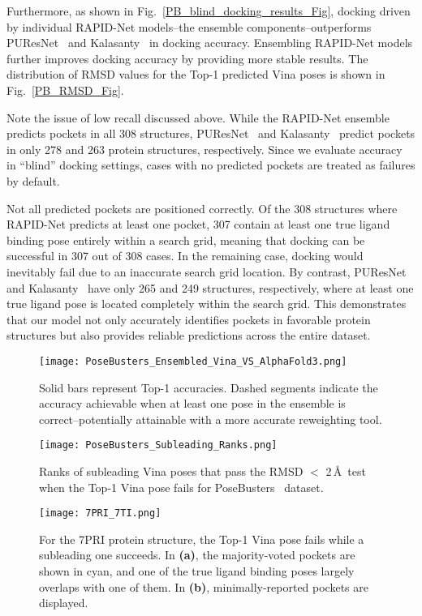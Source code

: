 \documentclass[10pt,conference]{IEEEtran}
\begin{document}
Furthermore, as shown in Fig.~\ref{PB_blind_docking_results_Fig}, docking driven by individual RAPID-Net models--the ensemble components--outperforms PUResNet~\cite{kandel2021puresnet} and Kalasanty~\cite{stepniewska2020improving} in docking accuracy. Ensembling RAPID-Net models further improves docking accuracy by providing more stable results. The distribution of RMSD values for the Top-1 predicted Vina poses is shown in Fig.~\ref{PB_RMSD_Fig}. 

Note the issue of low recall discussed above. While the RAPID-Net ensemble predicts pockets in all 308 structures, PUResNet~\cite{kandel2021puresnet} and Kalasanty~\cite{stepniewska2020improving} predict pockets in only 278 and 263 protein structures, respectively. Since we evaluate accuracy in ``blind'' docking settings, cases with no predicted pockets are treated as failures by default.

Not all predicted pockets are positioned correctly. Of the 308 structures where RAPID-Net predicts at least one pocket, 307 contain at least one true ligand binding pose entirely within a search grid, meaning that docking can be successful in 307 out of 308 cases. In the remaining case, docking would inevitably fail due to an inaccurate search grid location. By contrast, PUResNet~\cite{kandel2021puresnet} and Kalasanty~\cite{stepniewska2020improving} have only 265 and 249 structures, respectively, where at least one true ligand pose is located completely within the search grid. This demonstrates that our model not only accurately identifies pockets in favorable protein structures but also provides reliable predictions across the entire dataset.

\begin{figure}[]{}
\texttt{[image: PoseBusters\_Ensembled\_Vina\_VS\_AlphaFold3.png]}
\caption{Solid bars represent Top-1 accuracies. Dashed segments indicate the accuracy achievable when at least one pose in the ensemble is correct--potentially attainable with a more accurate reweighting tool.}
\label{PB_with_reweighting_Fig}
\end{figure}
\begin{figure}[]{}
\texttt{[image: PoseBusters\_Subleading\_Ranks.png]}
\caption{Ranks of subleading Vina poses that pass the RMSD $<$ 2\,\AA\ test when the Top-1 Vina pose fails for PoseBusters~\cite{Buttenschoen2024} dataset.}
\label{PB_Subleading_Ranks_Fig}
\end{figure}

\begin{figure*}[]{}
\texttt{[image: 7PRI\_7TI.png]}
\caption{For the 7PRI protein structure, the Top-1 Vina pose fails while a subleading one succeeds. In \textbf{(a)}, the majority-voted pockets are shown in cyan, and one of the true ligand binding poses largely overlaps with one of them. In \textbf{(b)}, minimally-reported pockets are displayed.}
\label{7PRI_7TI_Fig}
\end{figure*}
\end{document}

